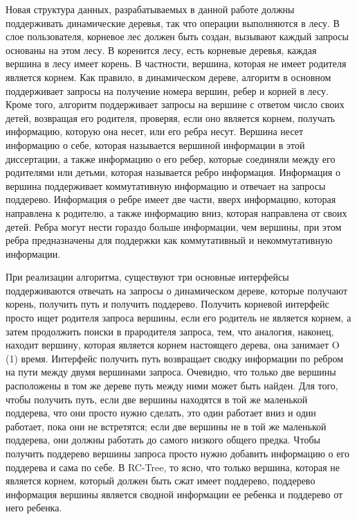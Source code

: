 \documentclass[specification,annotation,times]{itmo-student-thesis}
\newcommand{\revise}[1]{{\color{red!70!black} #1 }}
\begin{document}
\revise{
Новая структура данных, разрабатываемых в данной работе должны поддерживать динамические деревья, так что операции выполняются в лесу. В слое пользователя, корневое лес должен быть создан, вызывают каждый 
запросы основаны на этом лесу. В коренится лесу, есть корневые деревья, каждая вершина в лесу имеет корень. В частности, вершина, которая не имеет родителя является корнем. Как правило, в динамическом 
дереве, алгоритм в основном поддерживает запросы на получение номера вершин, ребер и корней в лесу. Кроме того, алгоритм поддерживает запросы на вершине с ответом число своих детей, возвращая его 
родителя, проверяя, если оно является корнем, получать информацию, которую она несет, или его ребра несут. Вершина несет информацию о себе, которая называется вершиной информации в этой диссертации, а 
также информацию о его ребер, которые соединяли между его родителями или детьми, которая называется ребро информация. Информация о вершина поддерживает коммутативную информацию и отвечает на запросы 
поддерево. Информация о ребре имеет две части, вверх информацию, которая направлена к родителю, а также информацию вниз, которая направлена от своих детей. Ребра могут нести гораздо больше информации, чем 
вершины, при этом ребра предназначены для поддержки как коммутативный и некоммутативную информации.
}

\revise{
При реализации алгоритма, существуют три основные интерфейсы поддерживаются отвечать на запросы о динамическом дереве, которые получают корень, получить путь и получить поддерево. Получить корневой 
интерфейс просто ищет родителя запроса вершины, если его родитель не является корнем, а затем продолжить поиски в прародителя запроса, тем, что аналогия, наконец, находит вершину, которая является корнем 
настоящего дерева, она занимает O (1) время. Интерфейс получить путь возвращает сводку информации по ребром на пути между двумя вершинами запроса. Очевидно, что только две вершины расположены в том же 
дереве путь между ними может быть найден. Для того, чтобы получить путь, если две вершины находятся в той же маленькой поддерева, что они просто нужно сделать, это один работает вниз и один работает, пока 
они не встретятся; если две вершины не в той же маленькой поддерева, они должны работать до самого низкого общего предка. Чтобы получить поддерево вершины запроса просто нужно добавить информацию о его 
поддерева и сама по себе. В RC-Tree, то ясно, что только вершина, которая не является корнем, который должен быть сжат имеет поддерево, поддерево информация вершины является сводной информации ее ребенка 
и поддерево от него ребенка.
}
\end{document}
